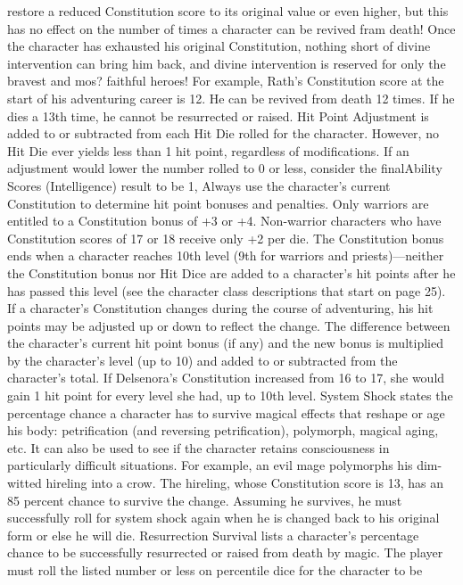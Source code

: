 \documentclass[../main.tex]{subfiles}
\begin{document}
\begin{multicols}{3}
restore a reduced Constitution score to its
original value or even higher, but this has no
effect on the number of times a character
can be revived fram death! Once the character has exhausted his original Constitution,
nothing short of divine intervention can
bring him back, and divine intervention is
reserved for only the bravest and mos?
faithful heroes!
For example, Rath’s Constitution score at
the start of his adventuring career is 12. He
can be revived from death 12 times. If he
dies a 13th time, he cannot be resurrected or
raised.
Hit Point Adjustment is added to or subtracted from each Hit Die rolled for the
character. However, no Hit Die ever yields
less than 1 hit point, regardless of modifications. If an adjustment would lower the
number rolled to 0 or less, consider the finalAbility Scores (Intelligence)
result to be 1, Always use the character's
current Constitution to determine hit point
bonuses and penalties.
Only warriors are entitled to a Constitution bonus of +3 or +4. Non-warrior characters who have Constitution scores of 17 or
18 receive only +2 per die.
The Constitution bonus ends when a
character reaches 10th level (9th for warriors and priests)—neither the Constitution
bonus nor Hit Dice are added to a character's hit points after he has passed this level
(see the character class descriptions that
start on page 25).
If a character's Constitution changes during the course of adventuring, his hit points
may be adjusted up or down to reflect the
change. The difference between the character’s current hit point bonus (if any) and the
new bonus is multiplied by the character's
level (up to 10) and added to or subtracted
from the character's total. If Delsenora’s
Constitution increased from 16 to 17, she
would gain 1 hit point for every level she
had, up to 10th level.
System Shock states the percentage
chance a character has to survive magical
effects that reshape or age his body: petrification (and reversing petrification), polymorph, magical aging, etc. It can also be
used to see if the character retains consciousness in particularly difficult situations. For example, an evil mage
polymorphs his dim-witted hireling into a
crow. The hireling, whose Constitution
score is 13, has an 85 percent chance to survive the change. Assuming he survives, he
must successfully roll for system shock
again when he is changed back to his original form or else he will die.
Resurrection Survival lists a character's
percentage chance to be successfully resurrected or raised from death by magic. The
player must roll the listed number or less on
percentile dice for the character to be

\end{multicols}
\end{document}

